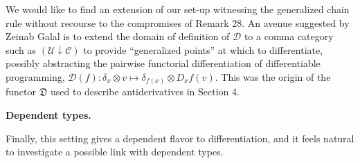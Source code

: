  
We would like to find an extension of our set-up witnessing the generalized chain rule without recourse to the compromises of Remark 28. An avenue suggested by Zeinab Galal is to extend the domain of definition of $\mathcal{D}$ to a comma category such as $(\mathcal{U}\downarrow\mathscr{C})$ to provide “generalized points” at which to differentiate, possibly abstracting the pairwise functorial differentiation of differentiable programming, $\mathcal{D}(f):\delta_{x}\otimes v\mapsto\delta_{f(x)}\otimes D_{x}f(v)$. This was the origin of the functor $\mathfrak{D}$ used to describe antiderivatives in Section 4.\par
 
 
 
 
\par\medskip\noindent\textbf{Dependent types.}\par
 
 
Finally, this setting gives a dependent flavor to differentiation, and it feels natural to investigate a possible link with dependent types.\par
 
 
 
